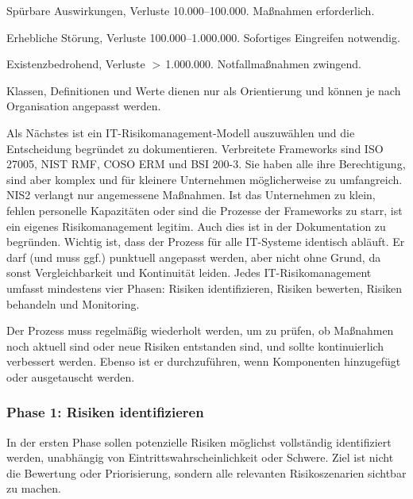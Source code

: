 \begin{tcolorbox}[title=Klasse 3: Mittel]
Spürbare Auswirkungen, Verluste 10.000–100.000\texteuro. Maßnahmen erforderlich.
\end{tcolorbox}

\begin{tcolorbox}[title=Klasse 4: Hoch]
Erhebliche Störung, Verluste 100.000–1.000.000\texteuro. Sofortiges Eingreifen notwendig.
\end{tcolorbox}

\begin{tcolorbox}[title=Klasse 5: Kritisch]
Existenzbedrohend, Verluste $>\,$1.000.000\texteuro. Notfallmaßnahmen zwingend.
\end{tcolorbox}

Klassen, Definitionen und Werte dienen nur als Orientierung und können je nach Organisation angepasst werden.

Als Nächstes ist ein IT-Risikomanagement-Modell auszuwählen und die Entscheidung begründet zu dokumentieren. Verbreitete Frameworks sind ISO 27005, NIST RMF, COSO ERM und BSI 200-3. Sie haben alle ihre Berechtigung, sind aber komplex und für kleinere Unternehmen möglicherweise zu umfangreich. NIS2 verlangt nur angemessene Maßnahmen. Ist das Unternehmen zu klein, fehlen personelle Kapazitäten oder sind die Prozesse der Frameworks zu starr, ist ein eigenes Risikomanagement legitim. Auch dies ist in der Dokumentation zu begründen. Wichtig ist, dass der Prozess für alle IT-Systeme identisch abläuft. Er darf (und muss ggf.) punktuell angepasst werden, aber nicht ohne Grund, da sonst Vergleichbarkeit und Kontinuität leiden. Jedes IT-Risikomanagement umfasst mindestens vier Phasen: Risiken identifizieren, Risiken bewerten, Risiken behandeln und Monitoring.

Der Prozess muss regelmäßig wiederholt werden, um zu prüfen, ob Maßnahmen noch aktuell sind oder neue Risiken entstanden sind, und sollte kontinuierlich verbessert werden. Ebenso ist er durchzuführen, wenn Komponenten hinzugefügt oder ausgetauscht werden.
\newpage
\subsubsection{Phase 1: Risiken identifizieren}
In der ersten Phase sollen potenzielle Risiken möglichst vollständig identifiziert werden, unabhängig von Eintrittswahrscheinlichkeit oder Schwere. Ziel ist nicht die Bewertung oder Priorisierung, sondern alle relevanten Risikoszenarien sichtbar zu machen.

